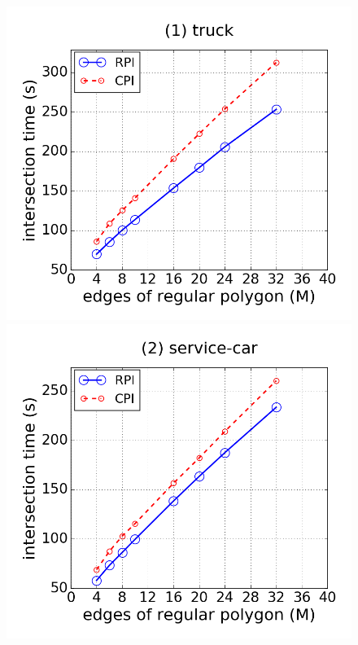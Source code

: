 \begin{figure}[tb!]
\centering
\includegraphics[scale = 0.245]{figures/Exp-M-poly-time-truck.png}
\includegraphics[scale = 0.245]{figures/Exp-M-poly-time-service.png}

\end{figure}
